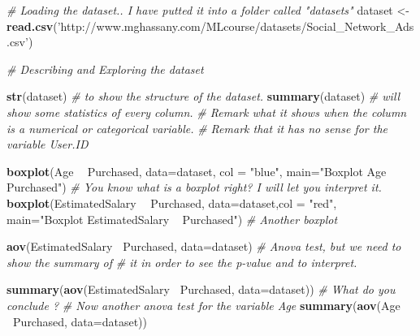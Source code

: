 \documentclass[]{book}
\newenvironment{Shaded}{\begin{snugshade}}{\end{snugshade}}
\newcommand{\KeywordTok}[1]{\textcolor[rgb]{0.13,0.29,0.53}{\textbf{#1}}}
\newcommand{\DataTypeTok}[1]{\textcolor[rgb]{0.13,0.29,0.53}{#1}}
\newcommand{\StringTok}[1]{\textcolor[rgb]{0.31,0.60,0.02}{#1}}
\newcommand{\CommentTok}[1]{\textcolor[rgb]{0.56,0.35,0.01}{\textit{#1}}}
\newcommand{\OperatorTok}[1]{\textcolor[rgb]{0.81,0.36,0.00}{\textbf{#1}}}
\newcommand{\NormalTok}[1]{#1}
\theoremstyle{definition}
\theoremstyle{definition}
\theoremstyle{definition}
\theoremstyle{remark}
\begin{document}
\begin{Shaded}
\begin{Highlighting}[]

\CommentTok{# Loading the dataset.. I have putted it into a folder called "datasets"}
\NormalTok{dataset <-}\StringTok{ }\KeywordTok{read.csv}\NormalTok{(}\StringTok{'http://www.mghassany.com/MLcourse/datasets/Social_Network_Ads.csv'}\NormalTok{)}

\CommentTok{# Describing and Exploring the dataset}

\KeywordTok{str}\NormalTok{(dataset) }\CommentTok{# to show the structure of the dataset. }
\KeywordTok{summary}\NormalTok{(dataset) }\CommentTok{# will show some statistics of every column. }
\CommentTok{# Remark what it shows when the column is a numerical or categorical variable.}
\CommentTok{# Remark that it has no sense for the variable User.ID}

\KeywordTok{boxplot}\NormalTok{(Age }\OperatorTok{~}\StringTok{ }\NormalTok{Purchased, }\DataTypeTok{data=}\NormalTok{dataset, }\DataTypeTok{col =} \StringTok{"blue"}\NormalTok{, }\DataTypeTok{main=}\StringTok{"Boxplot Age ~ Purchased"}\NormalTok{)}
\CommentTok{# You know what is a boxplot right? I will let you interpret it.}
\KeywordTok{boxplot}\NormalTok{(EstimatedSalary }\OperatorTok{~}\StringTok{ }\NormalTok{Purchased, }\DataTypeTok{data=}\NormalTok{dataset,}\DataTypeTok{col =} \StringTok{"red"}\NormalTok{, }\DataTypeTok{main=}\StringTok{"Boxplot EstimatedSalary ~ Purchased"}\NormalTok{)}
\CommentTok{# Another boxplot}

\KeywordTok{aov}\NormalTok{(EstimatedSalary }\OperatorTok{~}\NormalTok{Purchased, }\DataTypeTok{data=}\NormalTok{dataset)}
\CommentTok{# Anova test, but we need to show the summary of }
\CommentTok{# it in order to see the p-value and to interpret.}

\KeywordTok{summary}\NormalTok{(}\KeywordTok{aov}\NormalTok{(EstimatedSalary }\OperatorTok{~}\NormalTok{Purchased, }\DataTypeTok{data=}\NormalTok{dataset))}
\CommentTok{# What do you conclude ?}
\CommentTok{# Now another anova test for the variable Age}
\KeywordTok{summary}\NormalTok{(}\KeywordTok{aov}\NormalTok{(Age }\OperatorTok{~}\NormalTok{Purchased, }\DataTypeTok{data=}\NormalTok{dataset))}


\end{Highlighting}
\end{Shaded}
\end{document}
